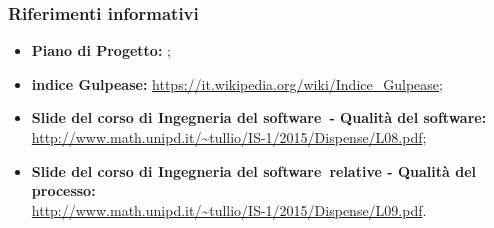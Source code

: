 \documentclass[../PianoDiQualifica.tex]{subfiles}
\begin{document}
		\subsubsection{Riferimenti informativi}
		\begin{itemize}
			\item \textbf{Piano di Progetto:} \pianodiprogettov;
			\item \textbf{indice Gulpease\g:} \url{https://it.wikipedia.org/wiki/Indice\_Gulpease};
			\item \textbf{Slide del corso di Ingegneria del software\g\ - Qualità del software\g:} \\\url{http://www.math.unipd.it/~tullio/IS-1/2015/Dispense/L08.pdf};
			\item \textbf{Slide del corso di Ingegneria del software\g\ relative - Qualità del processo\g:} \\\url{http://www.math.unipd.it/~tullio/IS-1/2015/Dispense/L09.pdf}.
		\end{itemize}
\end{document}
